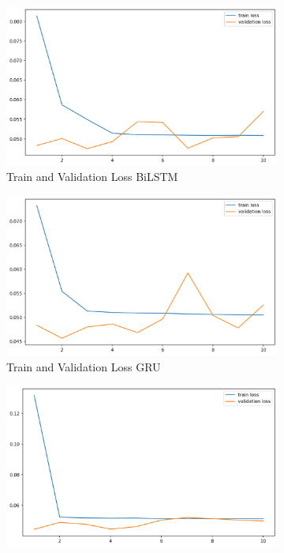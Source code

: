 \documentclass[utf8x]{ctexart}
\begin{document}
\begin{figure}[htb]
  \centering
  \begin{subfigure}[b]{0.48\textwidth}
    \centering
    \includegraphics[width=\textwidth]{../images/BiLSTM_trainlosses.png}
    \caption{Train and Validation Loss BiLSTM}
    \label{fig:BiLSTM_trainlosses}
  \end{subfigure}
  \begin{subfigure}[b]{0.48\textwidth}
    \centering
    \includegraphics[width=\textwidth]{../images/BiGRU_trainlosses.png}
    \caption{Train and Validation Loss GRU}
    \label{fig:BiGRU_trainlosses}
  \end{subfigure}
  \begin{subfigure}[b]{0.48\textwidth}
    \centering
    \includegraphics[width=\textwidth]{../images/Transformer_trainlosses.png}

\end{subfigure}
\end{figure}
\end{document}
